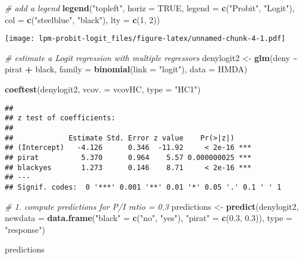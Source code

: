\documentclass[
]{article}
\newenvironment{Shaded}{\begin{snugshade}}{\end{snugshade}}
\newcommand{\CommentTok}[1]{\textcolor[rgb]{0.56,0.35,0.01}{\textit{#1}}}
\newcommand{\DataTypeTok}[1]{\textcolor[rgb]{0.13,0.29,0.53}{#1}}
\newcommand{\DecValTok}[1]{\textcolor[rgb]{0.00,0.00,0.81}{#1}}
\newcommand{\FloatTok}[1]{\textcolor[rgb]{0.00,0.00,0.81}{#1}}
\newcommand{\KeywordTok}[1]{\textcolor[rgb]{0.13,0.29,0.53}{\textbf{#1}}}
\newcommand{\NormalTok}[1]{#1}
\newcommand{\OperatorTok}[1]{\textcolor[rgb]{0.81,0.36,0.00}{\textbf{#1}}}
\newcommand{\OtherTok}[1]{\textcolor[rgb]{0.56,0.35,0.01}{#1}}
\newcommand{\StringTok}[1]{\textcolor[rgb]{0.31,0.60,0.02}{#1}}
\begin{document}
\begin{Shaded}
\begin{Highlighting}[]
\CommentTok{\# add a legend}
\KeywordTok{legend}\NormalTok{(}\StringTok{"topleft"}\NormalTok{,}
       \DataTypeTok{horiz =} \OtherTok{TRUE}\NormalTok{,}
       \DataTypeTok{legend =} \KeywordTok{c}\NormalTok{(}\StringTok{"Probit"}\NormalTok{, }\StringTok{"Logit"}\NormalTok{),}
       \DataTypeTok{col =} \KeywordTok{c}\NormalTok{(}\StringTok{"steelblue"}\NormalTok{, }\StringTok{"black"}\NormalTok{), }
       \DataTypeTok{lty =} \KeywordTok{c}\NormalTok{(}\DecValTok{1}\NormalTok{, }\DecValTok{2}\NormalTok{))}
\end{Highlighting}
\end{Shaded}

\texttt{[image: lpm-probit-logit\_files/figure-latex/unnamed-chunk-4-1.pdf]}

\begin{Shaded}
\begin{Highlighting}[]
\CommentTok{\# estimate a Logit regression with multiple regressors}
\NormalTok{denylogit2 \textless{}{-}}\StringTok{ }\KeywordTok{glm}\NormalTok{(deny }\OperatorTok{\textasciitilde{}}\StringTok{ }\NormalTok{pirat }\OperatorTok{+}\StringTok{ }\NormalTok{black, }
                  \DataTypeTok{family =} \KeywordTok{binomial}\NormalTok{(}\DataTypeTok{link =} \StringTok{"logit"}\NormalTok{), }
                  \DataTypeTok{data =}\NormalTok{ HMDA)}

\KeywordTok{coeftest}\NormalTok{(denylogit2, }\DataTypeTok{vcov. =}\NormalTok{ vcovHC, }\DataTypeTok{type =} \StringTok{"HC1"}\NormalTok{)}
\end{Highlighting}
\end{Shaded}

\begin{verbatim}
## 
## z test of coefficients:
## 
##             Estimate Std. Error z value    Pr(>|z|)    
## (Intercept)   -4.126      0.346  -11.92     < 2e-16 ***
## pirat          5.370      0.964    5.57 0.000000025 ***
## blackyes       1.273      0.146    8.71     < 2e-16 ***
## ---
## Signif. codes:  0 '***' 0.001 '**' 0.01 '*' 0.05 '.' 0.1 ' ' 1
\end{verbatim}

\begin{Shaded}
\begin{Highlighting}[]
\CommentTok{\# 1. compute predictions for P/I ratio = 0.3}
\NormalTok{predictions \textless{}{-}}\StringTok{ }\KeywordTok{predict}\NormalTok{(denylogit2, }
                       \DataTypeTok{newdata =} \KeywordTok{data.frame}\NormalTok{(}\StringTok{"black"}\NormalTok{ =}\StringTok{ }\KeywordTok{c}\NormalTok{(}\StringTok{"no"}\NormalTok{, }\StringTok{"yes"}\NormalTok{), }
                                            \StringTok{"pirat"}\NormalTok{ =}\StringTok{ }\KeywordTok{c}\NormalTok{(}\FloatTok{0.3}\NormalTok{, }\FloatTok{0.3}\NormalTok{)),}
                       \DataTypeTok{type =} \StringTok{"response"}\NormalTok{)}

\NormalTok{predictions}
\end{Highlighting}
\end{Shaded}
\end{document}
